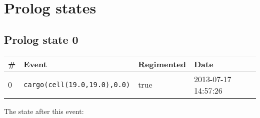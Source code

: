 \documentclass[11pt]{article}\usepackage[utf8]{inputenc}\usepackage{geometry}
\begin{document}
\section{Prolog states}
\clearpage 
\subsection{Prolog state 0}
\begin{table}[ht]
\centering 
\begin{tabular}{l l l l} 
\textbf{\#} & \textbf{Event} & \textbf{Regimented} & \textbf{Date} \\ [0.5ex] 
\hline
0&\texttt{cargo(cell(19.0,19.0),0.0)}&true&2013-07-17 14:57:26\\ [1ex] \hline\end{tabular}
\end{table}
The state after this event:
\end{document}
